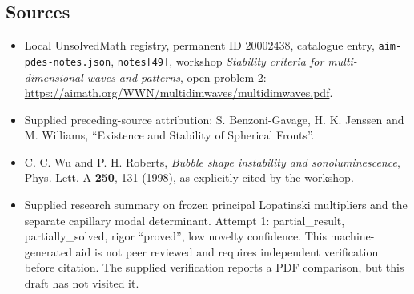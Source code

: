 \documentclass[11pt]{article}
\begin{document}
\subsection{Sources}
\begin{itemize}
\item Local UnsolvedMath registry, permanent ID \(20002438\), catalogue entry, \texttt{aim-pdes-notes.json}, \texttt{notes[49]}, workshop \emph{Stability criteria for multi-dimensional waves and patterns}, open problem 2: \url{https://aimath.org/WWN/multidimwaves/multidimwaves.pdf}.
\item Supplied preceding-source attribution: S. Benzoni-Gavage, H. K. Jenssen and M. Williams, ``Existence and Stability of Spherical Fronts''.
\item C. C. Wu and P. H. Roberts, \emph{Bubble shape instability and sonoluminescence}, Phys. Lett. A \textbf{250}, 131 (1998), as explicitly cited by the workshop.
\item Supplied research summary on frozen principal Lopatinski multipliers and the separate capillary modal determinant. Attempt 1: partial\_result, partially\_solved, rigor ``proved'', low novelty confidence. This machine-generated aid is not peer reviewed and requires independent verification before citation. The supplied verification reports a PDF comparison, but this draft has not visited it.
\end{itemize}
\end{document}
